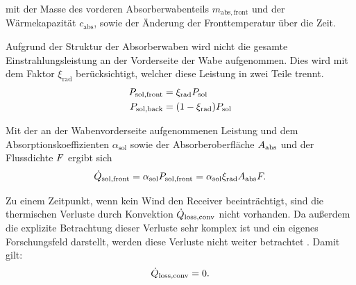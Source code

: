\vspace*{-\baselineskip}mit der Masse des vorderen Absorberwabenteils $m_{\mathrm{abs,front}}$ und der Wärmekapazität $c_{\mathrm{abs}}$, sowie der Änderung der Fronttemperatur über die Zeit.

Aufgrund der Struktur der Absorberwaben wird nicht die gesamte Einstrahlungsleistung an der Vorderseite der Wabe aufgenommen.
Dies wird mit dem Faktor $\xi_{\mathrm{rad}}$ berücksichtigt, welcher diese Leistung in zwei Teile trennt.
\begin{equation} \label{eq_SolareLeistung}
    \begin{aligned}
        P_{\mathrm{sol,front}} & = \xi_{\mathrm{rad}} P_{\mathrm{sol}}     \\
        P_{\mathrm{sol,back}}  & = (1-\xi_{\mathrm{rad}}) P_{\mathrm{sol}}
    \end{aligned}
\end{equation}

Mit der an der Wabenvorderseite aufgenommenen Leistung und dem Absorptionskoeffizienten $\alpha_{\mathrm{sol}}$ sowie der Absorberoberfläche $A_{\mathrm{abs}}$ und der Flussdichte $F$ ergibt sich
\begin{equation} \label{eq_SolareEinstrahlung}
\dot{Q}_{\mathrm{sol,front}} = \alpha_{\mathrm{sol}} P_{\mathrm{sol,front}} = \alpha_{\mathrm{sol}} \xi_{\mathrm{rad}} A_{\mathrm{abs}} F.
\end{equation}

Zu einem Zeitpunkt, wenn kein Wind den Receiver beeinträchtigt, sind die thermischen Verluste durch Konvektion $\dot{Q}_{\mathrm{loss,conv}}$ nicht vorhanden.
Da außerdem die explizite Betrachtung dieser Verluste sehr komplex ist und ein eigenes Forschungsfeld darstellt, werden diese Verluste nicht weiter betrachtet \cite{IdingSolarPaces}. Damit gilt:
\begin{equation} \label{eq_KonvektiveVerluste}
\dot{Q}_{\mathrm{loss,conv}} = 0.
\end{equation}

